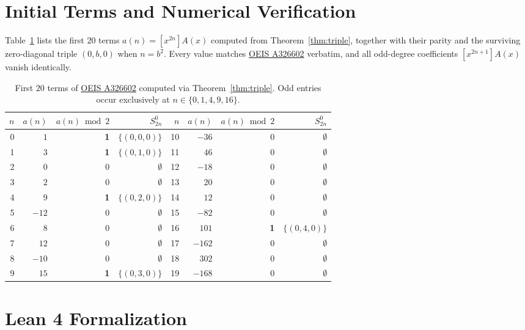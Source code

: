 \documentclass[11pt,a4paper]{article}
\theoremstyle{definition}
\theoremstyle{remark}
\newcommand{\coeff}[1]{[x^{#1}]}
\begin{document}
\section{Initial Terms and Numerical Verification}

Table~\ref{tab:values} lists the first $20$ terms $a(n) = \coeff{2n} A(x)$ computed from Theorem~\ref{thm:triple}, together with their parity and the surviving zero-diagonal triple $(0,b,0)$ when $n = b^2$. Every value matches \href{https://oeis.org/A326602}{OEIS A326602} verbatim, and all odd-degree coefficients $\coeff{2n+1} A(x)$ vanish identically.

\begin{table}[ht]
\centering
\caption{First $20$ terms of \href{https://oeis.org/A326602}{OEIS A326602} computed via Theorem~\ref{thm:triple}. Odd entries occur exclusively at $n \in \{0, 1, 4, 9, 16\}$.}
\label{tab:values}
\begin{tabular}{rrrr|rrrr}
\toprule
$n$ & $a(n)$ & $a(n) \bmod 2$ & $S_{2n}^{0}$ & $n$ & $a(n)$ & $a(n) \bmod 2$ & $S_{2n}^{0}$ \\
\midrule
0 & $1$   & \textbf{1} & $\{(0,0,0)\}$ & 10 & $-36$  & 0 & $\emptyset$ \\
1 & $3$   & \textbf{1} & $\{(0,1,0)\}$ & 11 & $46$   & 0 & $\emptyset$ \\
2 & $0$   & 0          & $\emptyset$   & 12 & $-18$  & 0 & $\emptyset$ \\
3 & $2$   & 0          & $\emptyset$   & 13 & $20$   & 0 & $\emptyset$ \\
4 & $9$   & \textbf{1} & $\{(0,2,0)\}$ & 14 & $12$   & 0 & $\emptyset$ \\
5 & $-12$ & 0          & $\emptyset$   & 15 & $-82$  & 0 & $\emptyset$ \\
6 & $8$   & 0          & $\emptyset$   & 16 & $101$  & \textbf{1} & $\{(0,4,0)\}$ \\
7 & $12$  & 0          & $\emptyset$   & 17 & $-162$ & 0 & $\emptyset$ \\
8 & $-10$ & 0          & $\emptyset$   & 18 & $302$  & 0 & $\emptyset$ \\
9 & $15$  & \textbf{1} & $\{(0,3,0)\}$ & 19 & $-168$ & 0 & $\emptyset$ \\
\bottomrule
\end{tabular}
\end{table}

\section{Lean 4 Formalization}
\end{document}
